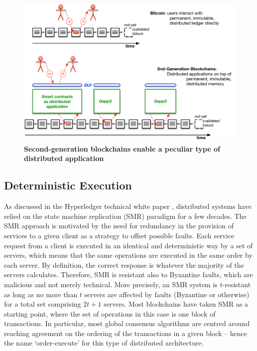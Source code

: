 \begin{figure}[h]
\centering
\includegraphics[width=17 cm]{Figures/dapps}
\caption{\bf \small Second-generation blockchains enable a peculiar type of distributed application}
\label{fig:dapps}
\end{figure}


\subsection{Deterministic Execution}
As discussed in the Hyperledger technical white paper \cite{AndroulakiEtAl2018}, distributed systems have relied on the state machine replication (SMR) paradigm \cite{Schneider1990} for a few decades. The SMR approach is motivated by the need for redundancy in the provision of services to a given client as a strategy to offset possible faults. Each service request from a client is executed in an identical and deterministic way by a set of servers, which means that the same operations are executed in the same order by each server. By definition, the correct response is whatever the majority of the servers calculates. Therefore, SMR is resistant also to Byzantine faults, which are malicious and not merely technical. More precisely, an SMR system is $t$-resistant as long as no more than $t$ servers are affected by faults (Byzantine or otherwise) for a total set comprising $2t + 1$ servers. Most blockchains have taken SMR as a starting point, where the set of operations in this case is one block of transactions. In particular, most global consensus algorithms are centred around reaching agreement on the ordering of the transactions in a given block -- hence the name `order-execute' for this type of distributed architecture.


